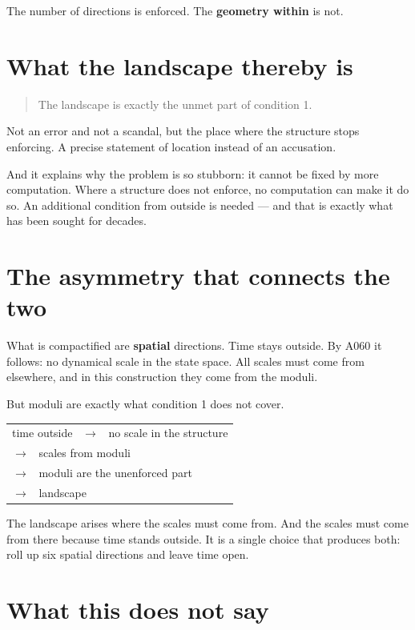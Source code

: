 \documentclass[11pt]{report}
\begin{document}
The number of directions is enforced. The \textbf{geometry within} is
not.

\section{What the landscape thereby is}

\begin{quote}
The landscape is exactly the unmet part of condition 1.
\end{quote}

Not an error and not a scandal, but the place where the structure stops
enforcing. A precise statement of location instead of an accusation.

And it explains why the problem is so stubborn: it cannot be fixed by
more computation. Where a structure does not enforce, no computation
can make it do so. An additional condition from outside is needed ---
and that is exactly what has been sought for decades.

\section{The asymmetry that connects the two}

What is compactified are \textbf{spatial} directions. Time stays
outside. By A060 it follows: no dynamical scale in the state space. All
scales must come from elsewhere, and in this construction they come
from the moduli.

But moduli are exactly what condition 1 does not cover.
\begin{center}
\begin{tabular}{l}
time outside \ $\to$ \ no scale in the structure \\
\phantom{time outside} $\to$ \ scales from moduli \\
\phantom{time outside} $\to$ \ moduli are the unenforced part \\
\phantom{time outside} $\to$ \ landscape \\
\end{tabular}
\end{center}

The landscape arises where the scales must come from. And the scales
must come from there because time stands outside. It is a single choice
that produces both: roll up six spatial directions and leave time open.

\section{What this does not say}
\end{document}
